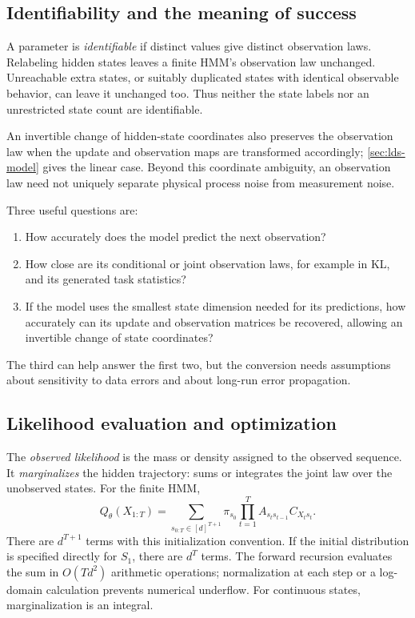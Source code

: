 \documentclass[11pt,twoside]{article}
\theoremstyle{definition}
\theoremstyle{remark}
\begin{document}
\subsection{Identifiability and the meaning of success}
\label{sec:identification}

A parameter is \emph{identifiable} if distinct values give distinct
observation laws. Relabeling hidden states leaves a finite HMM's observation law unchanged.
Unreachable extra states, or suitably duplicated states with identical
observable behavior, can leave it unchanged too. Thus neither the state
labels nor an unrestricted state count are identifiable.

An invertible change of hidden-state coordinates also preserves the
observation law when the update and observation maps are transformed
accordingly; \cref{sec:lds-model} gives the linear case. Beyond this coordinate
ambiguity, an observation law need not uniquely separate physical process
noise from measurement noise.

Three useful questions are:
\begin{enumerate}[leftmargin=*,itemsep=.2em]
\item How accurately does the model predict the next observation?
\item How close are its conditional or joint observation laws, for example
in KL, and its generated task statistics?
\item If the model uses the smallest state dimension needed for its
predictions, how accurately can its update and observation matrices be
recovered, allowing an invertible change of state coordinates?
\end{enumerate}
The third can help answer the first two, but the conversion needs
assumptions about sensitivity to data errors and about long-run error
propagation.

\subsection{Likelihood evaluation and optimization}
\label{sec:latent-likelihood}

The \emph{observed likelihood} is the mass or density assigned to the
observed sequence. It \emph{marginalizes} the hidden trajectory: sums or
integrates the joint law over the unobserved states. For the
finite HMM,
\begin{equation}
 Q_\theta(X_{1:T})=
 \sum_{s_{0:T}\in[d]^{T+1}}
 \pi_{s_0}\prod_{t=1}^T A_{s_ts_{t-1}}C_{X_ts_t}.
 \label{eq:hmm-likelihood}
\end{equation}
There are \(d^{T+1}\) terms with this initialization convention.
If the initial distribution is specified directly for \(S_1\),
there are \(d^T\) terms. The forward recursion evaluates the sum in
\(O(Td^2)\) arithmetic operations; normalization at each step or a
log-domain calculation prevents numerical underflow.
For continuous states, marginalization is an integral.
\end{document}
